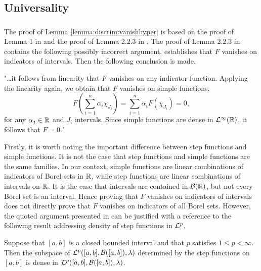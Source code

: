\subsection{Universality}

\subsubsection{}
\label{subsubsection:appendix:universality:continuous:cybenko}
The proof of Lemma \ref{lemma:discrim:vanishhyper} is based on the proof of Lemma 1 in \cite{cybenko_1989_approximation} and the proof of Lemma 2.2.3 in \cite{calin_2020_deep}.
The proof of Lemma 2.2.3 in \cite{calin_2020_deep} contains the following possibly incorrect argument. \cite{calin_2020_deep} establishes that $F$ vanishes on indicators of intervals. Then the following conclusion is made.
\begin{displayquote}
"\ldots it follows from linearity that $F$ vanishes on any indicator function. Applying the linearity again, we obtain that $F$ vanishes on simple functions, \[
    F \left (\sum_{i = 1}^n \alpha_i \chi_{J_i} \right) = \sum_{i = 1}^n \alpha_i F (\chi_{J_i}) = 0,
\]
for any $\alpha_j \in {\mathbb R}$ and $J_i$ intervals. Since simple functions are dense in ${\mathcal {L}^\infty}({\mathbb R})$, it follows that $F=0$."
\end{displayquote}
Firstly, it is worth noting the important difference between step functions and simple functions. It is not the case that step functions and simple functions are the same families. In our context, simple functions are linear combinations of indicators of Borel sets in ${\mathbb R}$, while step functions are linear combinations of intervals on ${\mathbb R}$. It is the case that intervals are contained in ${\mathcal B}({\mathbb R})$, but not every Borel set is an interval. Hence proving that $F$ vanishes on indicators of intervals does not directly prove that $F$ vanishes on indicators of all Borel sets.
However, the quoted argument presented in \cite{calin_2020_deep} can be justified with a reference to the following result addressing density of step functions in ${\mathcal {L}^p}$.
\pagebreak
\begin{proposition}
Suppose that $[a,b]$ is a closed bounded interval and that $p$ satisfies $1 \leq p < \infty$. Then the subspace of ${\mathcal {L}^p}([a,b], {\mathcal B}([a,b]), \lambda)$ determined by 
the step functions on $[a,b]$ is dense in ${\mathcal {L}^p}([a,b], {\mathcal B}([a,b]), \lambda)$.
\end{proposition}

